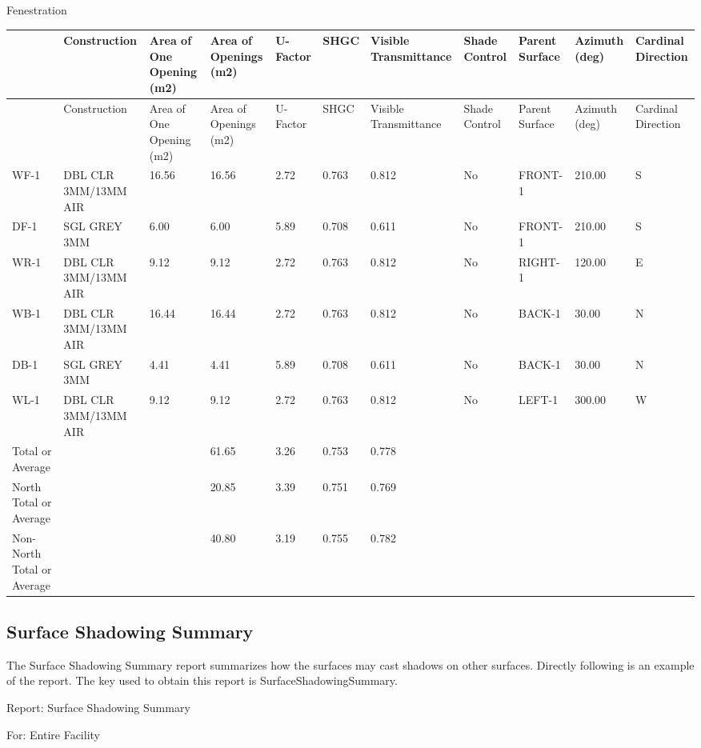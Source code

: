 Fenestration

{\scriptsize
\begin{longtable}[c]{>{\raggedright}p{0.5in}>{\raggedright}p{0.5in}>{\raggedright}p{0.5in}>{\raggedright}p{0.5in}>{\raggedright}p{0.5in}>{\raggedright}p{0.5in}>{\raggedright}p{0.5in}>{\raggedright}p{0.5in}>{\raggedright}p{0.5in}>{\raggedright}p{0.5in}>{\raggedright}p{0.5in}}
\toprule 
~ & Construction & Area of One Opening (m2) & Area of Openings (m2) & U-Factor & SHGC & Visible Transmittance & Shade Control & Parent Surface & Azimuth (deg) & Cardinal Direction \tabularnewline
\midrule
\endfirsthead

\toprule 
~ & Construction & Area of One Opening (m2) & Area of Openings (m2) & U-Factor & SHGC & Visible Transmittance & Shade Control & Parent Surface & Azimuth (deg) & Cardinal Direction \tabularnewline
\midrule
\endhead

WF-1 & DBL CLR 3MM/13MM AIR & 16.56 & 16.56 & 2.72 & 0.763 & 0.812 & No & FRONT-1 & 210.00 & S \tabularnewline
DF-1 & SGL GREY 3MM & 6.00 & 6.00 & 5.89 & 0.708 & 0.611 & No & FRONT-1 & 210.00 & S \tabularnewline
WR-1 & DBL CLR 3MM/13MM AIR & 9.12 & 9.12 & 2.72 & 0.763 & 0.812 & No & RIGHT-1 & 120.00 & E \tabularnewline
WB-1 & DBL CLR 3MM/13MM AIR & 16.44 & 16.44 & 2.72 & 0.763 & 0.812 & No & BACK-1 & 30.00 & N \tabularnewline
DB-1 & SGL GREY 3MM & 4.41 & 4.41 & 5.89 & 0.708 & 0.611 & No & BACK-1 & 30.00 & N \tabularnewline
WL-1 & DBL CLR 3MM/13MM AIR & 9.12 & 9.12 & 2.72 & 0.763 & 0.812 & No & LEFT-1 & 300.00 & W \tabularnewline
Total or Average & ~ & ~ & 61.65 & 3.26 & 0.753 & 0.778 & ~ & ~ & ~ & ~ \tabularnewline
North Total or Average & ~ & ~ & 20.85 & 3.39 & 0.751 & 0.769 & ~ & ~ & ~ & ~ \tabularnewline
Non-North Total or Average & ~ & ~ & 40.80 & 3.19 & 0.755 & 0.782 & ~ & ~ & ~ & ~ \tabularnewline
\bottomrule
\end{longtable}}

\subsection{Surface Shadowing Summary}\label{surface-shadowing-summary}

The Surface Shadowing Summary report summarizes how the surfaces may cast shadows on other surfaces. Directly following is an example of the report. The key used to obtain this report is SurfaceShadowingSummary.

Report: Surface Shadowing Summary

For: Entire Facility

